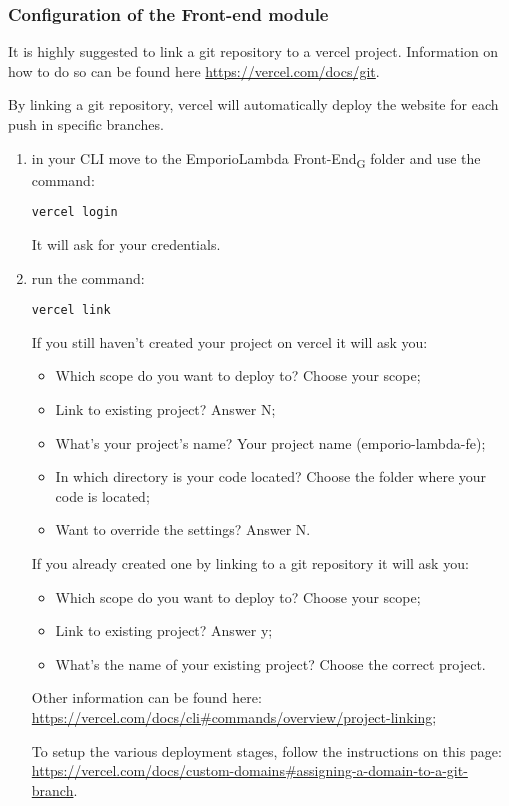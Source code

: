 \subsubsection{Configuration of the Front-end module}
It is highly suggested to link a git repository to a vercel project. Information on how to do so can be found here \url{https://vercel.com/docs/git}.

By linking a git repository, vercel will automatically deploy the website for each push in specific branches.
\begin{enumerate}
\item in your CLI move to the EmporioLambda Front-End\textsubscript{G} folder and use the command:\begin{center}\texttt{vercel login}\end{center}It will ask for your credentials.
\item run the command:\begin{center}\texttt{vercel link}\end{center} If you still haven't created your project on vercel it will ask you:
\begin{itemize}
\item Which scope do you want to deploy to? Choose your scope;
\item Link to existing project? Answer N;
\item What’s your project’s name? Your project name (emporio-lambda-fe);
\item In which directory is your code located? Choose the folder where your code is located;
\item Want to override the settings? Answer N.
\end{itemize}
If you already created one by linking to a git repository it will ask you:
\begin{itemize}
\item Which scope do you want to deploy to? Choose your scope;
\item Link to existing project? Answer y;
\item What’s the name of your existing project? Choose the correct project.
\end{itemize}
Other information can be found here: \url{https://vercel.com/docs/cli\#commands/overview/project-linking};

To setup the various deployment stages, follow the instructions on this page: \url{https://vercel.com/docs/custom-domains#assigning-a-domain-to-a-git-branch}.
\end{enumerate}